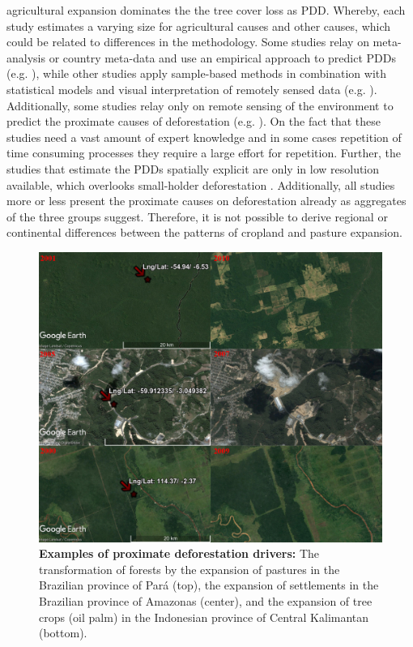 agricultural expansion dominates the the tree cover loss as \ac{PDD}. Whereby, each study estimates a varying size for agricultural causes and other causes, which could be related to differences in the methodology. Some studies relay on meta-analysis or country meta-data and use an empirical approach to predict \acp{PDD} (e.g. \citet{Hosonuma2012,Geist2002,DeFries2010,Carter2018,Ruf2014}), while other studies apply sample-based methods in combination with statistical models and visual interpretation of remotely sensed data (e.g. \citet{Sy2015,Austin2019,Curtis2018,Meyfroidt2013,Caldas2013}). Additionally, some studies relay only on remote sensing of the environment to predict the proximate causes of deforestation (e.g. \citet{Caldas2013,Zalles2018,Graesser2015,Connette2016,Barima2016}). On the fact that these studies need a vast amount of expert knowledge and in some cases repetition of time consuming processes they require a large effort for repetition. Further, the studies that estimate the \acp{PDD} spatially explicit are only in low resolution available, which overlooks small-holder deforestation \citep{Curtis2018,Caldas2013}. Additionally, all studies more or less present the proximate causes on deforestation already as aggregates of the three groups \citet{Geist2001} suggest. Therefore, it is not possible to derive regional or continental differences between the patterns of cropland and pasture expansion.
	\begin{figure}[ht]
		\centering
		\includegraphics[scale=0.53]{img/deforestation_examples}
		\caption[Examples of proximate deforestation drivers]{\textbf{Examples of proximate deforestation drivers:} The transformation of forests by the expansion of pastures in the Brazilian province of Pará (top), the expansion of settlements in the Brazilian province of Amazonas (center), and the expansion of tree crops (oil palm) in the Indonesian province of Central Kalimantan (bottom).}
		\label{fig:deforestationexamples}
	\end{figure}

